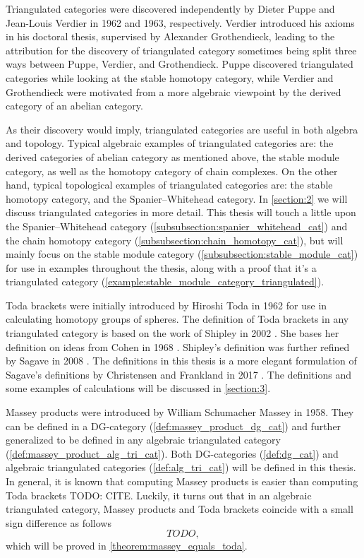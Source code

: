 Triangulated categories were discovered independently by Dieter Puppe and Jean-Louis Verdier in 1962 and 1963, respectively. Verdier introduced his axioms in his doctoral thesis, supervised by Alexander Grothendieck, leading to the attribution for the discovery of triangulated category sometimes being split three ways between Puppe, Verdier, and Grothendieck. Puppe discovered triangulated categories while looking at the stable homotopy category, while Verdier and Grothendieck were motivated from a more algebraic viewpoint by the derived category of an abelian category.

As their discovery would imply, triangulated categories are useful in both algebra and topology. Typical algebraic examples of triangulated categories are: the derived categories of abelian category as mentioned above, the stable module category, as well as the homotopy category of chain complexes. On the other hand, typical topological examples of triangulated categories are: the stable homotopy category, and the Spanier--Whitehead category. In \autoref{section:2} we will discuss triangulated categories in more detail. This thesis will touch a little upon the Spanier--Whitehead category (\autoref{subsubsection:spanier_whitehead_cat}) and the chain homotopy category (\autoref{subsubsection:chain_homotopy_cat}), but will mainly focus on the stable module category (\autoref{subsubsection:stable_module_cat}) for use in examples throughout the thesis, along with a proof that it's a triangulated category (\autoref{example:stable_module_category_triangulated}).

Toda brackets were initially introduced by Hiroshi Toda in 1962 for use in calculating homotopy groups of spheres. The definition of Toda brackets in any triangulated category is based on the work of Shipley in 2002 \cite[Definition A.2]{Shipley_2002}. She bases her definition on ideas from Cohen in 1968 \cite[Definition at the bottom of p. 308]{Cohen_1968}. Shipley's definition was further refined by Sagave in 2008 \cite[Remark 4.5]{Sagave_2008}. The definitions in this thesis is a more elegant formulation of Sagave's definitions by Christensen and Frankland in 2017 \cite[Definition 3.1]{Christensen-Frankland_2017}. The definitions and some examples of calculations will be discussed in \autoref{section:3}.

Massey products were introduced by William Schumacher Massey in 1958. They can be defined in a DG-category (\autoref{def:massey_product_dg_cat}) and further generalized to be defined in any algebraic triangulated category (\autoref{def:massey_product_alg_tri_cat}). Both DG-categories (\autoref{def:dg_cat}) and algebraic triangulated categories (\autoref{def:alg_tri_cat}) will be defined in this thesis. In general, it is known that computing Massey products is easier than computing Toda brackets TODO: CITE. Luckily, it turns out that in an algebraic triangulated category, Massey products and Toda brackets coincide with a small sign difference as follows
\[
    TODO,
\]
which will be proved in \autoref{theorem:massey_equals_toda}.

